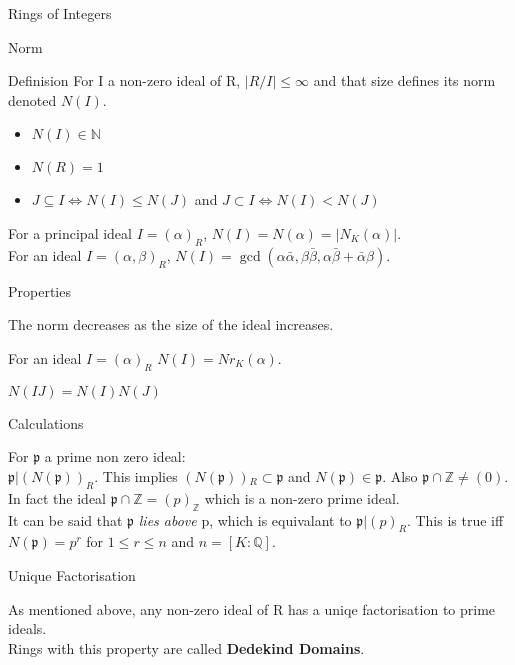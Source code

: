 \documentclass[12pt, letterpaper]{article}
\newcommand{\Q}{\mathbb{Q}}
\newcommand{\Z}{\mathbb{Z}}
\newcommand{\N}{\mathbb{N}}
\newcommand{\p}{\mathfrak{p}}
\begin{document}
\begin{section}{Rings of Integers}
\begin{subsection}{Norm}
\begin{subsubsection}{Definision}
      For I a non-zero ideal of R, \(| R / I | \leq \infty\) and that size
      defines its norm denoted \(N(I)\).
      \begin{itemize}
        \item \(N(I) \in \N\)
        \item \(N(R) = 1\)
        \item \(J \subseteq I \iff N(I) \leq N(J)\) and
              \(J \subset I \iff N(I) < N(J)\)
      \end{itemize}
      For a principal ideal \(I = (\alpha)_{R}\), \(N(I) = N(\alpha) =
      | N_{K}(\alpha) |\). \\
      For an ideal \(I = (\alpha, \beta)_{R}\), \(N(I) = \gcd(
      \alpha \bar{\alpha}, \beta \bar{\beta}, \alpha \bar{\beta} + \bar{\alpha} \beta)\).

    \end{subsubsection}

    \begin{subsubsection}{Properties}

      The norm decreases as the size of the ideal increases.

      For an ideal \(I = (\alpha)_{R}\) \(N(I) = Nr_{K}(\alpha)\).

      \(N(IJ) = N(I)N(J)\)

    \end{subsubsection}

    \begin{subsubsection}{Calculations}

      For \(\p\) a prime non zero ideal: \\
      \(\p | (N(\p))_{R}\). This implies \((N(\p)){}_{R} \subset \p\) and
      \(N(\p) \in \p\). Also \(\p \cap \Z \neq (0)\). In fact the ideal
      \(\p \cap \Z = (p)_{\Z}\) which is a non-zero prime ideal. \\
      It can be said that \(\p\) \textit{lies above} p, which is equivalant to
      \(\p | (p)_{R}\). This is true iff \(N(\p) = p^{r}\) for
      \(1 \leq r \leq n\) and \(n = [K : \Q]\).

    \end{subsubsection}

  \end{subsection}

  \begin{subsection}{Unique Factorisation}

    As mentioned above, any non-zero ideal of R has a uniqe factorisation to
    prime ideals. \\
    Rings with this property are called \textbf{Dedekind Domains}.


\end{subsection}
\end{section}
\end{document}
